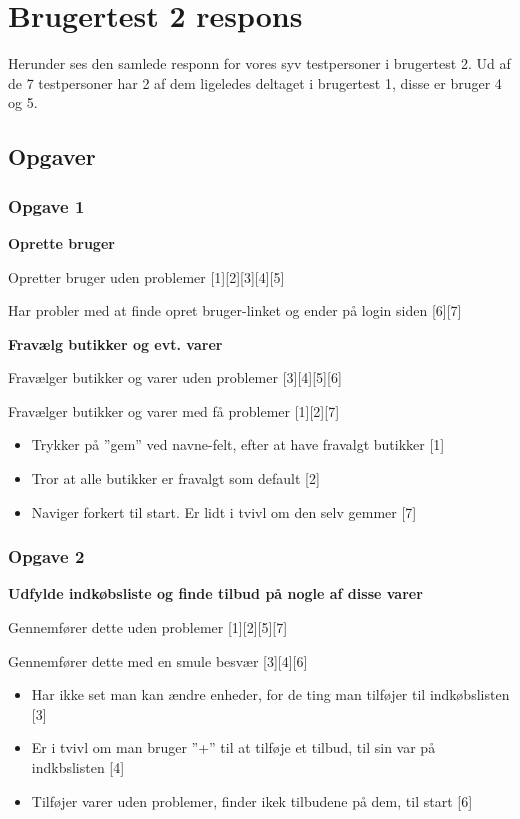 \chapter{Brugertest 2 respons}\label{b:brugertestrespons2}
Herunder ses den samlede responn for vores syv testpersoner i brugertest 2.
Ud af de 7 testpersoner har 2 af dem ligeledes deltaget i brugertest 1, disse er bruger 4 og 5.

\section{Opgaver}
\subsection{Opgave 1}
\textbf{Oprette bruger}

Opretter bruger uden problemer [1][2][3][4][5]

Har probler med at finde opret bruger-linket og ender på login siden [6][7]

\textbf{Fravælg butikker og evt. varer}

Fravælger butikker og varer uden problemer [3][4][5][6]

Fravælger butikker og varer med få problemer [1][2][7]
\begin{itemize}
	\item Trykker på ''gem'' ved navne-felt, efter at have fravalgt butikker [1]
	\item Tror at alle butikker er fravalgt som default [2]
	\item Naviger forkert til start. Er lidt i tvivl om den selv gemmer [7]
\end{itemize}

\subsection{Opgave 2}
\textbf{Udfylde indkøbsliste og finde tilbud på nogle af disse varer}

Gennemfører dette uden problemer [1][2][5][7]

Gennemfører dette med en smule besvær [3][4][6]
\begin{itemize}
	\item Har ikke set man kan ændre enheder, for de ting man tilføjer til indkøbslisten [3]
	\item Er i tvivl om man bruger ''+'' til at tilføje et tilbud, til sin var på indkbslisten [4]
	\item Tilføjer varer uden problemer, finder ikek tilbudene på dem, til start [6]
\end{itemize}

